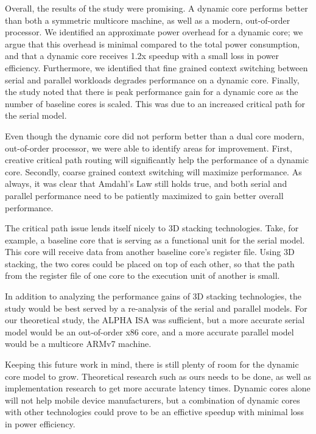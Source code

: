 Overall, the results of the study were promising. A dynamic core performs better than both a symmetric multicore machine, as well as a modern, out-of-order processor. We identified an approximate power overhead for a dynamic core; we argue that this overhead is minimal compared to the total power consumption, and that a dynamic core receives 1.2x speedup with a small loss in power efficiency. Furthermore, we identified that fine grained context switching between serial and parallel workloads degrades performance on a dynamic core. Finally, the study noted that there is peak performance gain for a dynamic core as the number of baseline cores is scaled. This was due to an increased critical path for the serial model.

Even though the dynamic core did not perform better than a dual core modern, out-of-order processor, we were able to identify areas for improvement. First, creative critical path routing will significantly help the performance of a dynamic core. Secondly, coarse grained context switching will maximize performance. As always, it was clear that Amdahl's Law still holds true, and both serial and parallel performance need to be patiently maximized to gain better overall performance.

The critical path issue lends itself nicely to 3D stacking technologies. Take, for example, a baseline core that is serving as a functional unit for the serial model. This core will receive data from another baseline core's register file. Using 3D stacking, the two cores could be placed on top of each other, so that the path from the register file of one core to the execution unit of another is small.

In addition to analyzing the performance gains of 3D stacking technologies, the study would be best served by a re-analysis of the serial and parallel models. For our theoretical study, the ALPHA ISA was sufficient, but a more accurate serial model would be an out-of-order x86 core, and a more accurate parallel model would be a multicore ARMv7 machine.

Keeping this future work in mind, there is still plenty of room for the dynamic core model to grow. Theoretical research such as ours needs to be done, as well as implementation research to get more accurate latency times. Dynamic cores alone will not help mobile device manufacturers, but a combination of dynamic cores with other technologies could prove to be an effictive speedup with minimal loss in power efficiency.